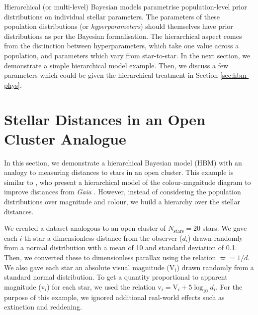 Hierarchical (or multi-level) Bayesian models parametrise population-level prior distributions on individual stellar parameters. The parameters of these population distributions (or \emph{hyperparameters}) should themselves have prior distributions as per the Bayesian formalisation. The hierarchical aspect comes from the distinction between hyperparameters, which take one value across a population, and parameters which vary from star-to-star. In the next section, we demonstrate a simple hierarchical model example. Then, we discuss a few parameters which could be given the hierarchical treatment in Section \ref{sec:hbm-phys}.

\section[Stellar Distances]{Stellar Distances in an Open Cluster Analogue}\label{sec:hbm-dist}

\newcommand{\appmag}{\ensuremath{\mathrm{v}}}
\newcommand{\absmag}{\ensuremath{\mathrm{V}}}

In this section, we demonstrate a hierarchical Bayesian model (HBM) with an analogy to measuring distances to stars in an open cluster. This example is similar to \citet{Leistedt.Hogg2017}, who present a hierarchical model of the colour-magnitude diagram to improve distances from \emph{Gaia} \citep{GaiaCollaboration.Prusti.ea2016}. However, instead of considering the population distributions over magnitude and colour, we build a hierarchy over the stellar distances.

We created a dataset analogous to an open cluster of \(N_\mathrm{stars}=20\) stars. We gave each \(i\)-th star a dimensionless distance from the observer (\(d_i\)) drawn randomly from a normal distribution with a mean of 10 and standard deviation of 0.1. Then, we converted these to dimensionless parallax using the relation \(\varpi = 1/d\). We also gave each star an absolute visual magnitude (\(\absmag_i\)) drawn randomly from a standard normal distribution. To get a quantity proportional to apparent magnitude (\(\appmag_i\)) for each star, we used the relation \(\appmag_i = \absmag_i + 5 \log_{10} d_i\). For the purpose of this example, we ignored additional real-world effects such as extinction and reddening.

%     

